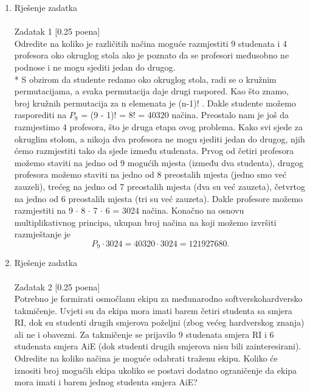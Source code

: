 \documentclass[12pt]{article}
\begin{document}
    
	\begin{enumerate}
		\item Rješenje zadatka \\
		\\
		Zadatak 1 [0.25 poena] \\
		
Odredite na koliko je različitih načina moguće razmjestiti 9 studenata i 4
profesora oko okruglog stola ako je poznato da se profesori međusobno ne
podnose i ne mogu sjediti jedan do drugog. \\

* S obzirom da studente redamo oko okruglog stola, radi se o kružnim
permutacijama, a svaka permutacija daje drugi raspored. Kao što znamo,
broj kružnih permutacija za n elemenata je (n-1)! . Dakle studente možemo
rasporediti na $P_{9}$ = (9 - 1)! = 8! = 40320 načina. Preostalo nam je
još da razmjestimo 4 profesora, što je druga etapa ovog problema. Kako svi
sjede za okruglim stolom, a nikoja dva profesora ne mogu sjediti jedan do
drugog, njih ćemo razmjestiti tako da sjede između studenata. Prvog od
četiri profesora možemo staviti na jedno od 9 mogućih mjesta (između dva
studenta), drugog profesora možemo staviti na jedno od 8 preostalih mjesta
(jedno smo već zauzeli), trećeg na jedno od 7 preostalih mjesta (dva su već
zauzeta), četvrtog na jedno od 6 preostalih mjesta (tri su već zauzeta).
Dakle profesore možemo razmjestiti na 9 ${\cdot}$ 8 ${\cdot}$ 7 ${\cdot}$ 6 = 3024 načina. 
Konačno na osnovu multiplikativnog
principa, ukupan broj načina na koji možemo izvršiti razmještanje je
\begin{equation*}
    P_{9} \cdot 3024 = 40320 \cdot 3024 = 121927680.
\end{equation*}
        
		\item Rješenje zadatka \\
		\\
		Zadatak 2 [0.25 poena] \\
		
Potrebno je formirati osmočlanu ekipu za međunarodno softverskohardversko
takmičenje. Uvjeti su da ekipa mora imati barem četiri studenta sa
smjera RI, dok su studenti drugih smjerova poželjni (zbog većeg hardverskog
znanja) ali ne i obavezni. Za takmičenje se prijavilo 9 studenata smjera RI i 6
studenata smjera AiE (dok studenti drugih smjerova nisu bili zainteresirani).
Odredite na koliko načina je moguće odabrati traženu ekipu. Koliko će iznositi
broj mogućih ekipa ukoliko se postavi dodatno ograničenje da ekipa mora
imati i barem jednog studenta smjera AiE? \\
		

\end{enumerate}
\end{document}
